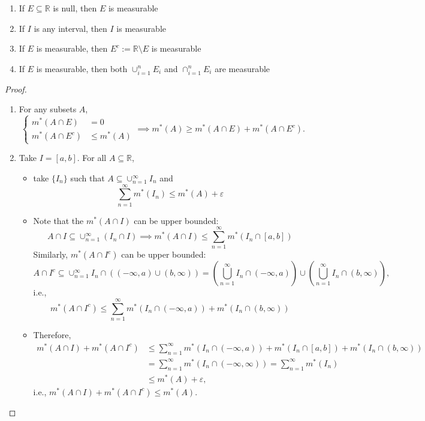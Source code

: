 \begin{proposition}
\begin{enumerate}
\item
If $E\subseteq\mathbb{R}$ is null, then $E$ is measurable
\item
If $I$ is any interval, then $I$ is measurable
\item
If $E$ is measurable, then $E^c:=\mathbb{R}\setminus E$ is measurable
\item
If $E$ is measurable, then both $\cup_{i=1}^nE_i$ and $\cap_{i=1}^nE_i$ are measurable
\end{enumerate}
\end{proposition}

\begin{proof}
\begin{enumerate}
\item
For any subsets $A$,
\[
\left\{
\begin{aligned}
m^*(A\cap E)&=0\\
m^*(A\cap E^c)&\le m^*(A)
\end{aligned}
\right.
\implies m^*(A)\ge m^*(A\cap E)+m^*(A\cap E^c).
\]
\item
Take $I=[a,b]$. For all $A\subseteq\mathbb{R}$,
\begin{itemize}
\item
take $\{I_n\}$ such that $A\subseteq\cup_{n=1}^\infty I_n$ and
\begin{equation}\label{Eq:8:8}
\sum_{n=1}^\infty m^*(I_n)\le m^*(A)+\varepsilon
\end{equation}
\item
Note that the $m^*(A\cap I)$ can be upper bounded:
\[
A\cap I\subseteq \cup_{n=1}^\infty (I_n\cap I)\implies
m^*(A\cap I)\le \sum_{n=1}^\infty m^*(I_n\cap[a,b])
\]
Similarly, $m^*(A\cap I^c)$ can be upper bounded:
\[
A\cap I^c \subseteq\cup_{n=1}^\infty I_n\cap((-\infty ,a)\cup(b,\infty))
=
\left(\bigcup_{n=1}^\infty I_n\cap (-\infty,a)\right)
\cup
\left(\bigcup_{n=1}^\infty I_n\cap (b,\infty)\right),
\]
i.e.,
\[
m^*(A\cap I^c)\le \sum_{n=1}^\infty m^*(I_n\cap(-\infty,a))
+m^*(I_n\cap(b,\infty))
\]
\item
Therefore,
\begin{align*}
m^*(A\cap I)+m^*(A\cap I^c)
&\le
\sum_{n=1}^\infty m^*(I_n\cap(-\infty,a))+m^*(I_n\cap[a,b])
+m^*(I_n\cap(b,\infty))\\&=
\sum_{n=1}^\infty
m^*(I_n\cap(-\infty,\infty))=
\sum_{n=1}^\infty
m^*(I_n)\\
&\le m^*(A)+\varepsilon,
\end{align*}
i.e., $m^*(A\cap I)+m^*(A\cap I^c)\le m^*(A)$.
\end{itemize}


\end{enumerate}
\end{proof}
